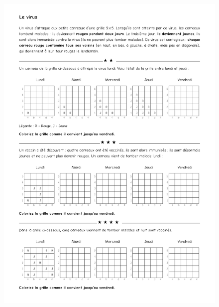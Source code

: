 \begin{figure}[H]
  \centering
  \includegraphics[width=0.95\linewidth]{5xDM/2-virus.pdf}
\end{figure}

